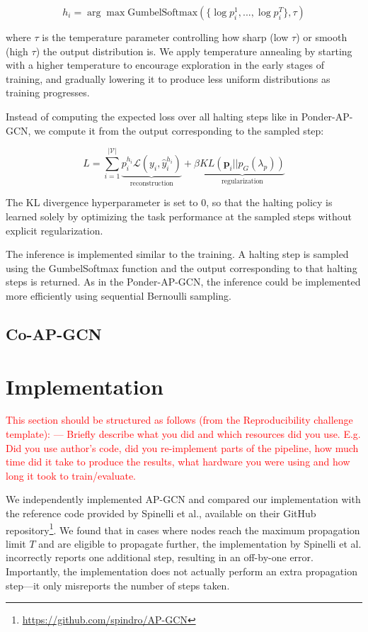 \documentclass{gdl}
\begin{document}
$$
    h_i = \arg\max \text{GumbelSoftmax}(\{\log p_i^1,...,\log p_i^{T}\}, \tau)
$$

\noindent where $\tau$ is the temperature parameter controlling how sharp (low $\tau$) or smooth (high $\tau$) the output distribution is. We apply temperature annealing by starting with a higher temperature to encourage exploration in the early stages of training, and gradually lowering it to produce less uniform distributions as training progresses.

Instead of computing the expected loss over all halting steps like in Ponder-AP-GCN, we compute it from the output corresponding to the sampled step:

$$
L = \sum_{i=1}^{\mathcal{|V|}} \underbrace{p_i^{h_i} \mathcal{L}(y_i, \hat{y}_i^{h_i})}_{\text{reconstruction}} + \beta \underbrace{KL(\mathbf{p}_i || p_G(\lambda_p))}_{\text{regularization}}
$$

\noindent The KL divergence hyperparameter is set to 0, so that the halting policy is learned solely by optimizing the task performance at the sampled steps without explicit regularization. 

The inference is implemented similar to the training. A halting step is sampled using the GumbelSoftmax function and the output corresponding to that halting steps is returned. As in the Ponder-AP-GCN, the inference could be implemented more efficiently using sequential Bernoulli sampling.

\subsection{Co-AP-GCN}

\section{Implementation}

\textcolor{red}{
This section should be structured as follows (from the Reproducibility challenge template):
---
Briefly describe what you did and which resources did you use. E.g. Did you use author's code, did you re-implement parts of the pipeline, how much time did it take to produce the results, what hardware you were using and how long it took to train/evaluate. }

We independently implemented AP-GCN and compared our implementation with the reference code provided by Spinelli et al., available on their GitHub repository\footnote{\url{https://github.com/spindro/AP-GCN}}. We found that in cases where nodes reach the maximum propagation limit $T$ and are eligible to propagate further, the implementation by Spinelli et al. incorrectly reports one additional step, resulting in an off-by-one error. Importantly, the implementation does not actually perform an extra propagation step—it only misreports the number of steps taken.
\end{document}
